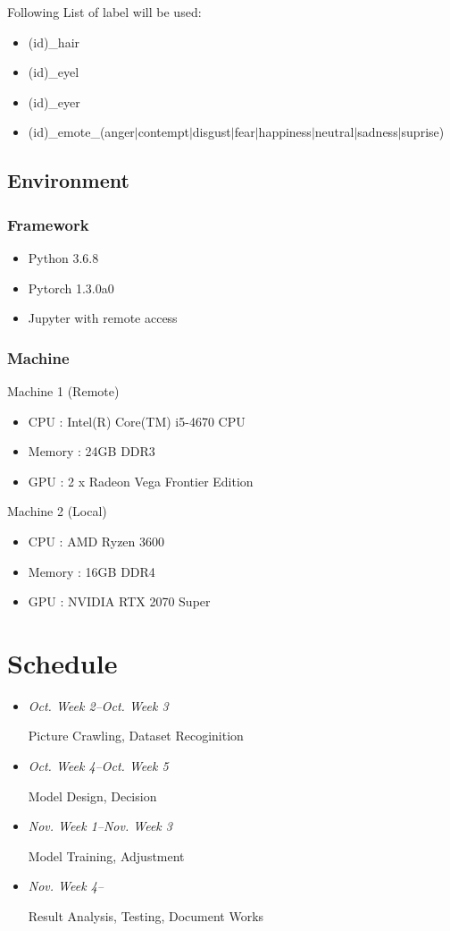 \documentclass{article}
\begin{document}
Following List of label will be used:
\begin{itemize}
\item (id)\_hair
\item (id)\_eyel
\item (id)\_eyer
\item (id)\_emote\_(anger$|$contempt$|$disgust$|$fear\newline$|$happiness$|$neutral$|$sadness$|$suprise)
\end{itemize}

\subsection{Environment}

\subsubsection{Framework}

\begin{itemize}
\item Python 3.6.8
\item Pytorch 1.3.0a0
\item Jupyter with remote access
\end{itemize}

\subsubsection{Machine}
Machine 1 (Remote)
\begin{itemize}
\item CPU : Intel(R) Core(TM) i5-4670 CPU
\item Memory : 24GB DDR3
\item GPU : 2 x Radeon Vega Frontier Edition
\end{itemize}

Machine 2 (Local)
\begin{itemize}
\item CPU : AMD Ryzen 3600
\item Memory : 16GB DDR4
\item GPU : NVIDIA RTX 2070 Super
\end{itemize}


\section{Schedule}
\begin{itemize}
\item \emph{Oct. Week 2--Oct. Week 3}

Picture Crawling, Dataset Recoginition
\item \emph{Oct. Week 4--Oct. Week 5}

Model Design, Decision
\item \emph{Nov. Week 1--Nov. Week 3}

Model Training, Adjustment
\item \emph{Nov. Week 4--}

Result Analysis, Testing, Document Works
\end{itemize}
\end{document}
